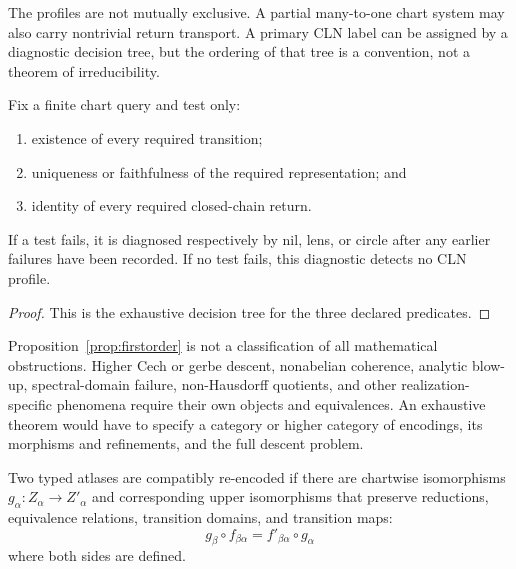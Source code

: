 \documentclass[11pt]{article}
\begin{document}
\begin{remark}[Coexistence]
The profiles are not mutually exclusive.  A partial many-to-one chart system
may also carry nontrivial return transport.  A primary CLN label can be
assigned by a diagnostic decision tree, but the ordering of that tree is a
convention, not a theorem of irreducibility.
\end{remark}

\begin{proposition}
\label{prop:firstorder}
Fix a finite chart query and test only:
\begin{enumerate}[label=(\roman*)]
\item existence of every required transition;
\item uniqueness or faithfulness of the required representation; and
\item identity of every required closed-chain return.
\end{enumerate}
If a test fails, it is diagnosed respectively by nil, lens, or circle after
any earlier failures have been recorded.  If no test fails, this diagnostic
detects no CLN profile.
\end{proposition}

\begin{proof}
This is the exhaustive decision tree for the three declared predicates.
\end{proof}

\begin{remark}
Proposition~\ref{prop:firstorder} is not a classification of all mathematical
obstructions.  Higher Cech or gerbe descent, nonabelian coherence, analytic
blow-up, spectral-domain failure, non-Hausdorff quotients, and other
realization-specific phenomena require their own objects and equivalences.
An exhaustive theorem would have to specify a category or higher category of
encodings, its morphisms and refinements, and the full descent problem.
\end{remark}

\begin{definition}
Two typed atlases are compatibly re-encoded if there are chartwise
isomorphisms $g_\alpha:Z_\alpha\to Z'_\alpha$ and corresponding upper
isomorphisms that preserve reductions, equivalence relations, transition
domains, and transition maps:
\[
g_\beta\circ f_{\beta\alpha}
=
f'_{\beta\alpha}\circ g_\alpha
\]
where both sides are defined.
\end{definition}
\end{document}
